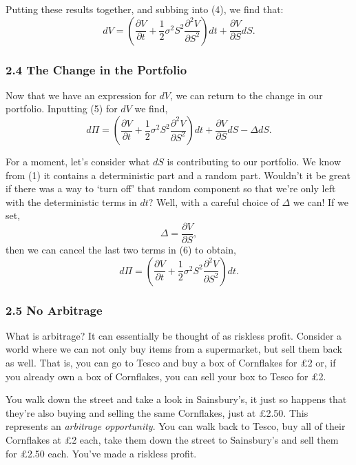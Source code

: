 \documentclass[11pt]{article}
\begin{document}
Putting these results together, and subbing into (4), we find that:
\begin{equation}
    dV = \left( \frac{\partial V}{\partial t} + \frac{1}{2} \sigma^2 S^2 \frac{\partial^2 V}{\partial S^2} \right) dt + \frac{\partial V}{\partial S} dS. 
\end{equation}

\subsubsection*{2.4 The Change in the Portfolio}
Now that we have an expression for $dV$, we can return to the change in our portfolio. Inputting (5) for $dV$ we find,
\begin{equation}
    d\Pi = \left( \frac{\partial V}{\partial t} + \frac{1}{2} \sigma^2 S^2 \frac{\partial^2 V}{\partial S^2} \right) dt + \frac{\partial V}{\partial S} dS - \Delta dS.
\end{equation}

For a moment, let's consider what $dS$ is contributing to our portfolio. We know from (1) it contains a deterministic part and a random part. Wouldn't it be great if there was a way to `turn off' that random component so that we're only left with the deterministic terms in $dt$? Well, with a careful choice of $\Delta$ we can! If we set,
\begin{equation}
    \Delta = \frac{\partial V}{\partial S},
\end{equation}
then we can cancel the last two terms in (6) to obtain,
\begin{equation}
    d\Pi = \left( \frac{\partial V}{\partial t} + \frac{1}{2} \sigma^2 S^2 \frac{\partial^2 V}{\partial S^2} \right) dt.
\end{equation}

\subsubsection*{2.5 No Arbitrage}
What is arbitrage? It can essentially be thought of as riskless profit. Consider a world where we can not only buy items from a supermarket, but sell them back as well. That is, you can go to Tesco and buy a box of Cornflakes for £2 or, if you already own a box of Cornflakes, you can sell your box to Tesco for £2.

You walk down the street and take a look in Sainsbury's, it just so happens that they're also buying and selling the same Cornflakes, just at £2.50. This represents an \textit{arbitrage opportunity}. You can walk back to Tesco, buy all of their Cornflakes at £2 each, take them down the street to Sainsbury's and sell them for £2.50 each. You've made a riskless profit.
\end{document}
